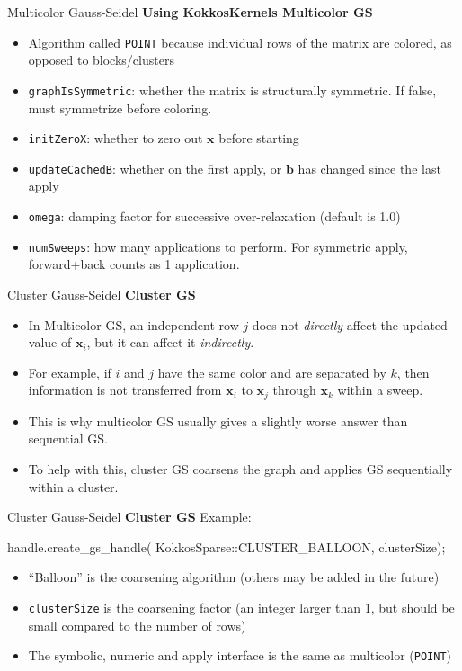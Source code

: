 \begin{frame}[fragile]{Multicolor Gauss-Seidel}
\textbf{Using KokkosKernels Multicolor GS}

\begin{itemize}
  \item Algorithm called \verb!POINT! because individual rows of the matrix are colored, as opposed to blocks/clusters
  \item \verb!graphIsSymmetric!: whether the matrix is structurally symmetric.
    If false, must symmetrize before coloring.
  \item \verb!initZeroX!: whether to zero out $\mathbf{x}$ before starting
  \item \verb!updateCachedB!: whether on the first apply, or $\mathbf{b}$ has changed since the last apply
  \item \verb!omega!: damping factor for successive over-relaxation (default is 1.0)
  \item \verb!numSweeps!: how many applications to perform. For symmetric apply, forward+back counts as 1 application.
\end{itemize}

\end{frame}

\begin{frame}[fragile]{Cluster Gauss-Seidel}
\textbf{Cluster GS}

\begin{itemize}
  \item In Multicolor GS, an independent row $j$ does not \emph{directly} affect the updated value of $\mathbf{x}_i$, but it can affect it \emph{indirectly}.
  \item For example, if $i$ and $j$ have the same color and are separated by $k$,
    then information is not transferred from $\mathbf{x}_i$ to $\mathbf{x}_j$ through $\mathbf{x}_k$ within a sweep.
  \item This is why multicolor GS usually gives a slightly worse answer than sequential GS.
  \item To help with this, cluster GS coarsens the graph and applies GS sequentially within a cluster.
\end{itemize}
\end{frame}

\begin{frame}[fragile]{Cluster Gauss-Seidel}
\textbf{Cluster GS}
Example:
\begin{code}
  handle.create_gs_handle(
    KokkosSparse::CLUSTER_BALLOON, clusterSize);
\end{code}
\begin{itemize}
  \item ``Balloon'' is the coarsening algorithm (others may be added in the future)
  \item \verb!clusterSize! is the coarsening factor (an integer larger than 1, but should be small compared to the number of rows)
  \item The symbolic, numeric and apply interface is the same as multicolor (\verb!POINT!)
\end{itemize}
\end{frame}


